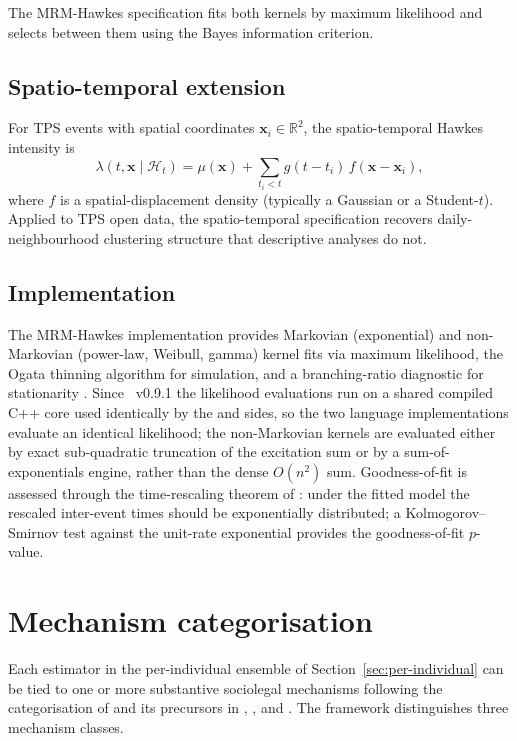 \documentclass[article,shortnames,nojss]{jss}
\begin{document}
The MRM-Hawkes specification fits both kernels by maximum
likelihood and selects between them using the Bayes information
criterion.

\subsection{Spatio-temporal extension}

For TPS events with spatial coordinates $\mathbf{x}_i \in
\mathbb{R}^2$, the spatio-temporal Hawkes intensity is
\begin{equation}
\lambda(t, \mathbf{x} \mid \mathcal{H}_t) = \mu(\mathbf{x}) +
\sum_{t_i < t} g(t - t_i)\, f(\mathbf{x} - \mathbf{x}_i),
\end{equation}
where $f$ is a spatial-displacement density (typically a Gaussian
or a Student-$t$). Applied to TPS open data, the spatio-temporal
specification recovers daily-neighbourhood clustering structure
that descriptive analyses do not.

\subsection{Implementation}

The MRM-Hawkes implementation provides Markovian (exponential) and
non-Markovian (power-law, Weibull, gamma) kernel fits via maximum
likelihood, the Ogata thinning algorithm for simulation, and a
branching-ratio diagnostic for stationarity \citep{Ruhela2026Hawkes}.
Since ~v0.9.1 the likelihood evaluations run on a shared
compiled C++ core used identically by the  and
 sides, so the two language implementations evaluate an
identical likelihood; the non-Markovian kernels are evaluated either by exact
sub-quadratic truncation of the excitation sum or by a
sum-of-exponentials engine, rather than the dense $O(n^2)$ sum.
Goodness-of-fit is assessed through the time-rescaling theorem of
\citet{BrownEtAl2002}: under the fitted model the rescaled
inter-event times should be exponentially distributed; a
Kolmogorov--Smirnov test against the unit-rate exponential
provides the goodness-of-fit $p$-value.

\section{Mechanism categorisation}
\label{sec:mechanism}

Each estimator in the per-individual ensemble of
Section~\ref{sec:per-individual} can be tied to one or more
substantive sociolegal mechanisms following the categorisation of
\citet{ZorroMedina2023JMP} and its precursors in
\citet{Becker1968}, \citet{CohenFelson1979}, and
\citet{Apel2013}. The framework distinguishes three mechanism
classes.
\end{document}
